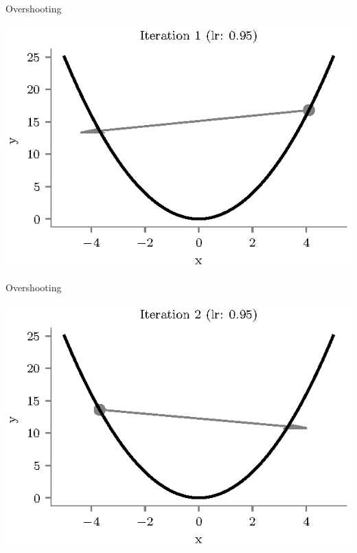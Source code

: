 \documentclass{beamer}
\begin{document}
\begin{frame}{Overshooting}
\begin{center}
\includegraphics[totalheight=6cm]{overshooting-1.eps}
\end{center}
\end{frame}

\begin{frame}{Overshooting}
\begin{center}
\includegraphics[totalheight=6cm]{overshooting-2.eps}
\end{center}
\end{frame}
\end{document}
